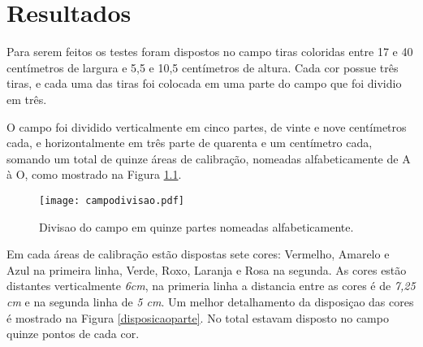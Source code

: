\chapter{Resultados} 


	Para serem feitos os testes foram dispostos no campo tiras coloridas entre 17 e 40 centímetros de largura e  5,5 e 10,5 centímetros de altura. Cada cor possue três tiras, e cada uma das tiras foi colocada em uma parte do campo que foi dividio em três.


O campo foi dividido verticalmente em cinco partes, de vinte e nove centímetros cada, e horizontalmente em três parte de quarenta e um centímetro cada, somando um total de quinze áreas de calibração, nomeadas alfabeticamente de A à O, como mostrado na Figura \ref{campodivisao}.

\begin{figure}[!: h]
		\centering
		\texttt{[image: campodivisao.pdf]}
		\caption{Divisao do campo em quinze partes nomeadas alfabeticamente.}
		\label{campodivisao}
	\end{figure}
	
Em cada áreas de calibração estão dispostas sete cores: Vermelho, Amarelo e Azul na primeira linha, Verde, Roxo, Laranja e Rosa na segunda. As cores estão distantes verticalmente \textit{6cm}, na primeria linha a distancia entre as cores é de \textit{7,25 cm} e na segunda linha de \textit{5 cm}. Um  melhor detalhamento da disposiçao das cores é  mostrado na Figura \ref{disposicaoparte}. No total estavam disposto no campo quinze pontos de cada cor.



